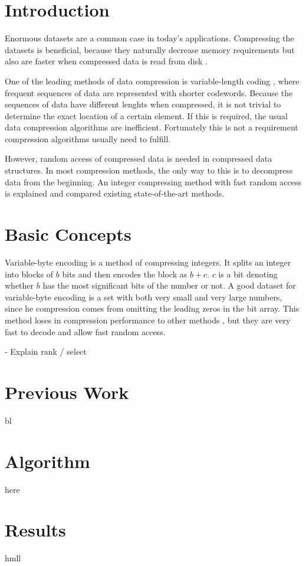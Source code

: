 \chapter{Introduction}
Enormous datasets are a common case in today's applications. Compressing the datasets is beneficial, because they 
naturally decrease memory requirements but also are faster when compressed data is read from disk \citep{Zob95}.

One of the leading methods of data compression is variable-length coding \citep{Sal99}, where frequent sequences of data
are represented with shorter codewords. Because the sequences of data have different lenghts when compressed, it is 
not trivial to determine the exact location of a certain element. If this is required, the usual data compression algorithms are
inefficient. Fortunately this is not a requirement compression algorithms usually need to fulfill. 

However, random access of compressed data is needed in compressed data structures. In most compression methods, the only way 
to this is to decompress data from the beginning. An integer compressing method with fast random access is explained and compared
existing state-of-the-art methods.

\chapter{Basic Concepts}
Variable-byte encoding \citep{Wil99} is a method of compressing integers. It splits an integer into blocks of $b$ bits and then encodes
the block as $b + c$. $c$ is a bit denoting whether $b$ has the most significant bits of the number or not. A good dataset for variable-byte encoding
is a set with both very small and very large numbers, since he compression comes from omitting the leading zeros in the bit array. This method 
loses in compression performance to other methods \citep{Bri09}, but they are very fast to decode and allow fast random access.

- Explain rank / select


\chapter{Previous Work}
bl
\chapter{Algorithm}
here
\chapter{Results}
hmll

